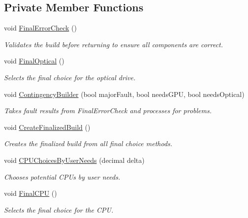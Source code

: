 \subsection*{Private Member Functions}
\begin{DoxyCompactItemize}
\item 
void \hyperlink{class_business_logic_1_1_build_processor_ad19fb4a3d40031b59c04aa2c9f563ee9}{Final\+Error\+Check} ()
\begin{DoxyCompactList}\small\item\em Validates the build before returning to ensure all components are correct. \end{DoxyCompactList}\item 
void \hyperlink{class_business_logic_1_1_build_processor_a7b2999f8f325a3eac8d7ac3e2467360e}{Final\+Optical} ()
\begin{DoxyCompactList}\small\item\em Selects the final choice for the optical drive. \end{DoxyCompactList}\item 
void \hyperlink{class_business_logic_1_1_build_processor_a736030c17f756a67be21d12063588514}{Contingency\+Builder} (bool major\+Fault, bool needs\+G\+PU, bool needs\+Optical)
\begin{DoxyCompactList}\small\item\em Takes fault results from Final\+Error\+Check and processes for problems. \end{DoxyCompactList}\item 
void \hyperlink{class_business_logic_1_1_build_processor_a48241b1584e37cbfeac0cf69fa573740}{Create\+Finalized\+Build} ()
\begin{DoxyCompactList}\small\item\em Creates the finalized build from all final choice methods. \end{DoxyCompactList}\item 
void \hyperlink{class_business_logic_1_1_build_processor_a6d400fb8ccd35e9f769c8090fc1ad6d9}{C\+P\+U\+Choices\+By\+User\+Needs} (decimal delta)
\begin{DoxyCompactList}\small\item\em Chooses potential C\+P\+Us by user needs. \end{DoxyCompactList}\item 
void \hyperlink{class_business_logic_1_1_build_processor_a4ab80278d65763824f1bfa573738f5f0}{Final\+C\+PU} ()
\begin{DoxyCompactList}\small\item\em Selects the final choice for the C\+PU. \end{DoxyCompactList}\item 

\end{DoxyCompactItemize}

